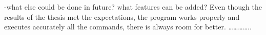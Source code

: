 
-what else could be done in future? what features can be added?
  Even though the results of the thesis met the expectations, the program works properly and  executes accurately all the commands, there is always room for better.  …………..



\clearpage